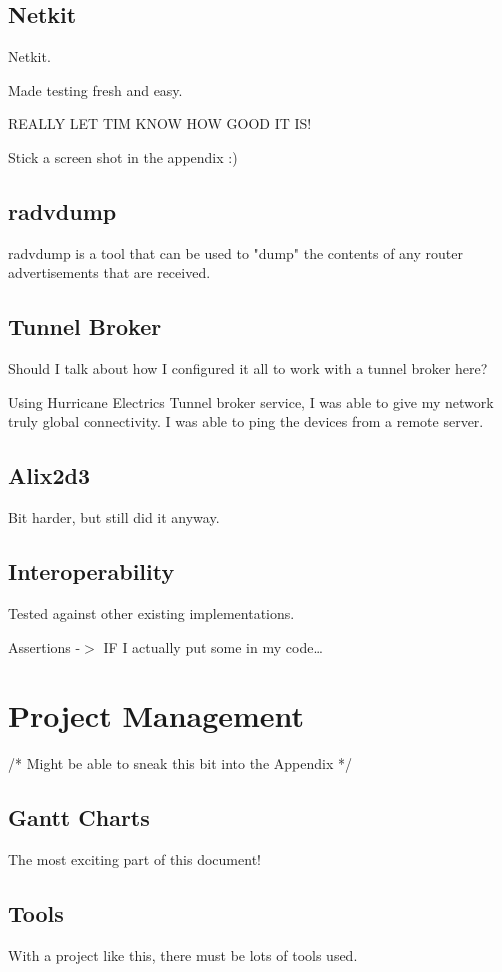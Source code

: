\documentclass[12pt]{report}
\begin{document}
\section{Netkit} 
Netkit. 

Made testing fresh and easy. 

REALLY LET TIM KNOW HOW GOOD IT IS!

Stick a screen shot in the appendix :)

\section{radvdump}
radvdump is a tool that can be used to "dump" the contents of any router 
advertisements that are received. 


\section{Tunnel Broker}
Should I talk about how I configured it all to work with a tunnel broker here?

Using Hurricane Electrics Tunnel broker service, I was able to give my network
truly global connectivity. I was able to ping the devices from a remote server.

\section{Alix2d3}
Bit harder, but still did it anyway.

\section{Interoperability}

Tested against other existing implementations.

Assertions -$>$ IF I actually put some in my code\ldots

\chapter{Project Management}
/* Might be able to sneak this bit into the Appendix */

\section{Gantt Charts}
The most exciting part of this document!

\section{Tools}
With a project like this, there must be lots of tools used. 
\end{document}
